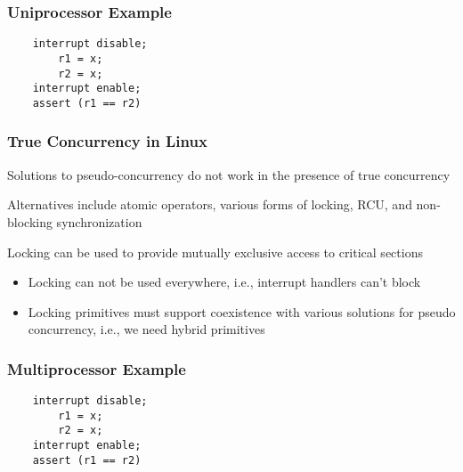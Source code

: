 \begin{frame}[fragile]
    \frametitle{Uniprocessor Example
    }
    \large    
    \begin{block}{}
        \begin{verbatim}
    interrupt disable;
        r1 = x;
        r2 = x;
    interrupt enable;
    assert (r1 == r2)
        \end{verbatim}
    \end{block}    
\end{frame}

\begin{frame}[fragile]
    \frametitle{True Concurrency in Linux}
    \Large
    Solutions to pseudo-concurrency do not work in the presence of
    true concurrency
    
    Alternatives include atomic operators, various forms of locking,
    RCU, and non-blocking synchronization
    
    Locking can be used to provide mutually exclusive access to
    critical sections
    \normalsize
    \begin{itemize}
        \item Locking can not be used everywhere, i.e., interrupt handlers
        can't block
               
        \item  Locking primitives must support coexistence with various
        solutions for pseudo concurrency, i.e., we need hybrid
        primitives
        
    \end{itemize}
    
\end{frame}


\begin{frame}[fragile]
    \frametitle{Multiprocessor Example}
    \large    
    \begin{block}{}
        \begin{verbatim}
    interrupt disable;
        r1 = x;
        r2 = x;
    interrupt enable;
    assert (r1 == r2)
        \end{verbatim}
    \end{block}    
\end{frame}


